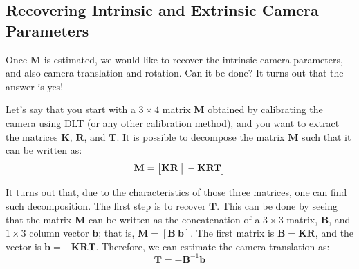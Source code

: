 \subsection{Recovering Intrinsic and Extrinsic Camera Parameters}
\label{sec:recovering_intrinsic_and_extrinsic}

Once $\mathbf{M}$ is estimated, we would like to recover the intrinsic camera parameters, and also camera translation and rotation. Can it be done? It turns out that the answer is yes!

Let's say that you start with a $3 \times 4$ matrix $\mathbf{M}$ obtained by calibrating the camera using DLT (or any other calibration method), and you want to extract the matrices $\mathbf{K}$, $\mathbf{R}$, and $\mathbf{T}$. It is possible to decompose the matrix $\mathbf{M}$ such that it can be written as:
\begin{equation}
    \mathbf{M} = 
    \begin{bmatrix}
    \mathbf{K}\mathbf{R} ~ \vline ~ -\mathbf{K}\mathbf{R}\mathbf{T} 
    \end{bmatrix}
\label{eq:projection_matrix_bis}
\end{equation}

It turns out that, due to the characteristics of those three matrices, one can find such decomposition. The first step is to recover $\mathbf{T}$. This can be done by seeing that the matrix $\mathbf{M}$ can be written as the concatenation of a $3 \times 3$ matrix, $\mathbf{B}$, and $1 \times 3$ column vector $\mathbf{b}$; that is, $\mathbf{M} =  \left [\mathbf{B} ~ \mathbf{b} \right]$. The first matrix is $\mathbf{B}=\mathbf{K}\mathbf{R}$, and the vector is $\mathbf{b}=-\mathbf{K}\mathbf{R}\mathbf{T}$. Therefore, we can estimate the camera translation as: 
\begin{equation}
    \mathbf{T} = - \mathbf{B}^{-1} \mathbf{b}
    \label{eq:recover_translation}
\end{equation}

